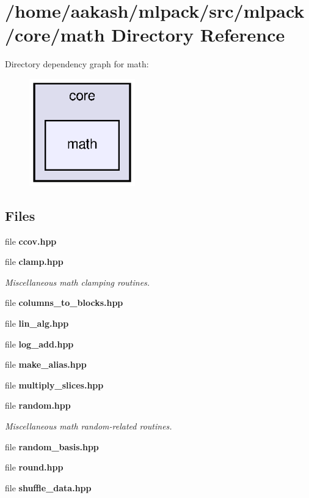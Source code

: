 \section{/home/aakash/mlpack/src/mlpack/core/math Directory Reference}
\label{dir_c99ddc62a84c9c2eac1febe115accba9}
Directory dependency graph for math\+:
\nopagebreak
\begin{figure}[H]
\begin{center}
\leavevmode
\includegraphics[width=130pt]{dir_c99ddc62a84c9c2eac1febe115accba9_dep}
\end{center}
\end{figure}
\subsection*{Files}
\begin{DoxyCompactItemize}
\item 
file \textbf{ ccov.\+hpp}
\item 
file \textbf{ clamp.\+hpp}
\begin{DoxyCompactList}\small\item\em Miscellaneous math clamping routines. \end{DoxyCompactList}\item 
file \textbf{ columns\+\_\+to\+\_\+blocks.\+hpp}
\item 
file \textbf{ lin\+\_\+alg.\+hpp}
\item 
file \textbf{ log\+\_\+add.\+hpp}
\item 
file \textbf{ make\+\_\+alias.\+hpp}
\item 
file \textbf{ multiply\+\_\+slices.\+hpp}
\item 
file \textbf{ random.\+hpp}
\begin{DoxyCompactList}\small\item\em Miscellaneous math random-\/related routines. \end{DoxyCompactList}\item 
file \textbf{ random\+\_\+basis.\+hpp}
\item 
file \textbf{ round.\+hpp}
\item 
file \textbf{ shuffle\+\_\+data.\+hpp}
\end{DoxyCompactItemize}

